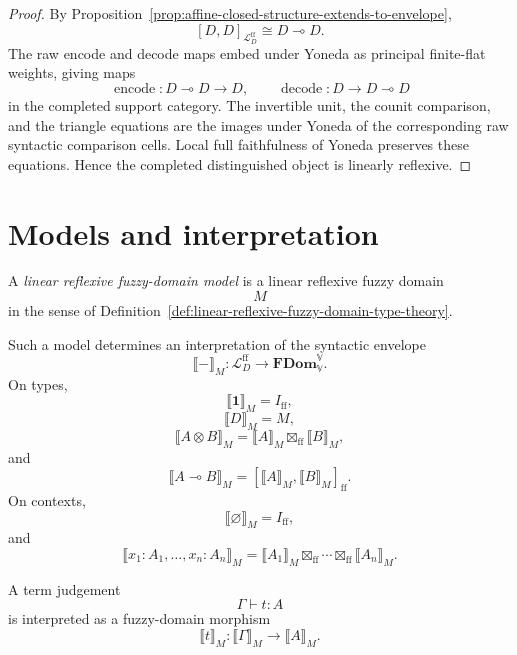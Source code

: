 \begin{proof}
By Proposition~\ref{prop:affine-closed-structure-extends-to-envelope},
\[
    [D,D]_{\mathcal L_D^{\mathrm{ff}}}
    \cong
    D\multimap D.
\]
The raw encode and decode maps embed under Yoneda as principal finite-flat
weights, giving maps
\[
    \operatorname{encode}:D\multimap D\to D,
    \qquad
    \operatorname{decode}:D\to D\multimap D
\]
in the completed support category.  The invertible unit, the counit comparison,
and the triangle equations are the images under Yoneda of the corresponding
raw syntactic comparison cells.  Local full faithfulness of Yoneda preserves
these equations.  Hence the completed distinguished object is linearly
reflexive.
\end{proof}

\section{Models and interpretation}
\label{sec:models-and-interpretation-affine-linear-cosmos}

\begin{definition}
\label{def:linear-reflexive-fuzzy-domain-model-cosmos}
A \emph{linear reflexive fuzzy-domain model} is a linear reflexive fuzzy domain
\[
    M
\]
in the sense of Definition~\ref{def:linear-reflexive-fuzzy-domain-type-theory}.
\end{definition}

Such a model determines an interpretation of the syntactic envelope
\[
    \llbracket-\rrbracket_M:
    \mathcal L_D^{\mathrm{ff}}
    \longrightarrow
    \mathbf{FDom}_{\mathbb V}^{\mathbb V}.
\]
On types,
\[
    \llbracket \mathbf 1\rrbracket_M
    =
    I_{\mathrm{ff}},
\]
\[
    \llbracket D\rrbracket_M
    =
    M,
\]
\[
    \llbracket A\otimes B\rrbracket_M
    =
    \llbracket A\rrbracket_M
    \boxtimes_{\mathrm{ff}}
    \llbracket B\rrbracket_M,
\]
and
\[
    \llbracket A\multimap B\rrbracket_M
    =
    [\llbracket A\rrbracket_M,
     \llbracket B\rrbracket_M]_{\mathrm{ff}}.
\]
On contexts,
\[
    \llbracket \varnothing\rrbracket_M
    =
    I_{\mathrm{ff}},
\]
and
\[
    \llbracket x_1:A_1,\dots,x_n:A_n\rrbracket_M
    =
    \llbracket A_1\rrbracket_M
    \boxtimes_{\mathrm{ff}}
    \cdots
    \boxtimes_{\mathrm{ff}}
    \llbracket A_n\rrbracket_M.
\]

A term judgement
\[
    \Gamma\vdash t:A
\]
is interpreted as a fuzzy-domain morphism
\[
    \llbracket t\rrbracket_M:
    \llbracket \Gamma\rrbracket_M
    \longrightarrow
    \llbracket A\rrbracket_M.
\]


